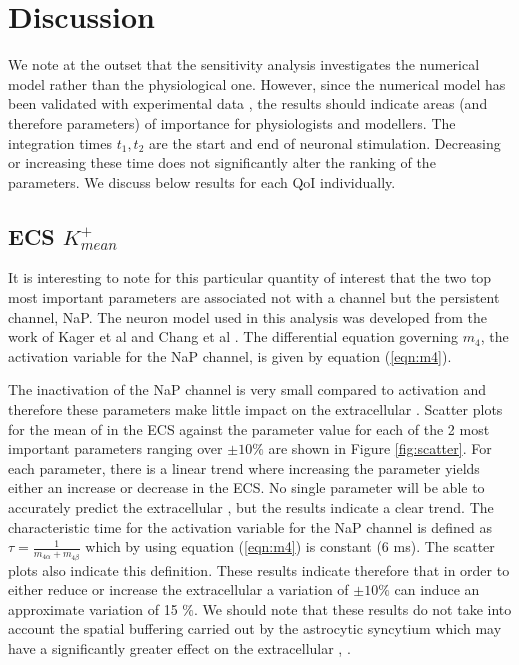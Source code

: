 \section{Discussion}
We  note at the outset that the sensitivity analysis investigates the numerical model rather than the physiological one. However, since the numerical model has been validated with experimental data  \cite{Dormanns2015,Mathias2018},  the results should indicate areas (and therefore parameters) of importance for physiologists and modellers. The integration times $t_1,t_2$ are the start and end of neuronal stimulation. Decreasing or increasing these time does not significantly alter the ranking of the parameters. We discuss below results for each QoI individually. 


\subsection{ECS $K^+_{mean}$}
It is interesting to note for this particular quantity of interest that the two top most important parameters are associated not with a \pot channel but the persistent \na channel, NaP.  The neuron model used in this analysis was developed from the work of Kager et al \cite{Kager2000a} and Chang et al \cite{Chang2013}.
The differential equation governing $m_4$,  the activation variable for the NaP channel, is given by equation (\ref{eqn:m4}).

The inactivation of the NaP channel is very small compared to activation and therefore these parameters make little impact on the extracellular \pot. 
Scatter plots for the mean of \pot in the  ECS against the parameter value for each of the 2 most important parameters ranging over $\pm 10\%$  are shown in Figure \ref{fig:scatter}.  For each parameter, there is a linear trend where increasing the parameter yields either an increase or decrease in the \pot ECS. No single parameter will be able to accurately predict the extracellular \pot, but the results indicate a clear trend. The characteristic time for the activation variable for the NaP channel is defined as $\tau=\frac{1}{m_{4 \alpha}+m_{4 \beta}}$ which by using equation (\ref{eqn:m4}) is constant (6 ms). The scatter plots also indicate this definition. These results indicate therefore that in order to either reduce or increase the extracellular \pot a variation of $\pm 10 \%$ can induce an approximate variation of 15 $\%$. We should note that these results do not take into account the spatial buffering carried out by the astrocytic syncytium which may have a significantly greater effect on the extracellular \pot , \cite{Bellot-Saez2017,Kenny2018b}. 

